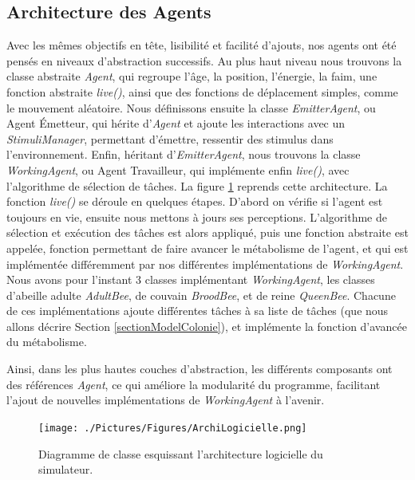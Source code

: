 			\subsection{Architecture des Agents}
			Avec les mêmes objectifs en tête, lisibilité et facilité d'ajouts, nos agents ont été pensés en niveaux d'abstraction successifs. Au plus haut niveau nous trouvons la classe abstraite \textit{Agent}, qui regroupe l'âge, la position, l'énergie, la faim, une fonction abstraite \textit{live()}, ainsi que des fonctions de déplacement simples, comme le mouvement aléatoire. Nous définissons ensuite la classe \textit{EmitterAgent}, ou Agent Émetteur, qui hérite d'\textit{Agent} et ajoute les interactions avec un \textit{StimuliManager}, permettant d'émettre, ressentir des stimulus dans l'environnement. Enfin, héritant d'\textit{EmitterAgent}, nous trouvons la classe \textit{WorkingAgent}, ou Agent Travailleur, qui implémente enfin \textit{live()}, avec l'algorithme de sélection de tâches. La figure \ref{ArchiLogicielle} reprends cette architecture. La fonction \textit{live()} se déroule en quelques étapes. D'abord on vérifie si l'agent est toujours en vie, ensuite nous mettons à jours ses perceptions. L'algorithme de sélection et exécution des tâches est alors appliqué, puis une fonction abstraite est appelée, fonction permettant de faire avancer le métabolisme de l'agent, et qui est implémentée différemment par nos différentes implémentations de \textit{WorkingAgent}. Nous avons pour l'instant 3 classes implémentant \textit{WorkingAgent}, les classes d'abeille adulte \textit{AdultBee}, de couvain \textit{BroodBee}, et de reine \textit{QueenBee}. Chacune de ces implémentations ajoute différentes tâches à sa liste de tâches (que nous allons décrire Section \ref{sectionModelColonie}), et implémente la fonction d'avancée du métabolisme.
			
			Ainsi, dans les plus hautes couches d'abstraction, les différents composants ont des références \textit{Agent}, ce qui améliore la modularité du programme, facilitant l'ajout de nouvelles implémentations de \textit{WorkingAgent} à l'avenir. 
			
			\begin{figure}
			\centering
			\texttt{[image: ./Pictures/Figures/ArchiLogicielle.png]}
			\caption{Diagramme de classe esquissant l'architecture logicielle du simulateur.}
			\label{ArchiLogicielle}
			\end{figure}
			
